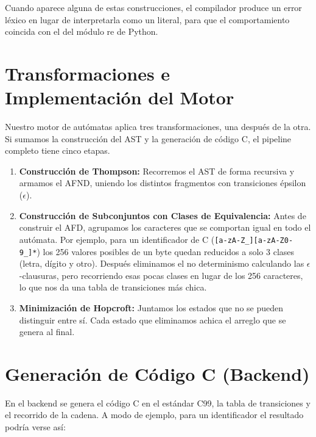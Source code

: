 \documentclass[runningheads]{llncs}
\begin{document}
Cuando aparece alguna de estas construcciones, el compilador produce un error léxico en lugar de interpretarla como un literal, para que el comportamiento coincida con el del módulo re de Python.

\section{Transformaciones e Implementación del Motor}
Nuestro motor de autómatas aplica tres transformaciones, una después de la otra. Si sumamos la construcción del AST y la generación de código C, el pipeline completo tiene cinco etapas.
\begin{enumerate}
  \item \textbf{Construcción de Thompson:} Recorremos el AST de forma recursiva y armamos el AFND, uniendo los distintos fragmentos con transiciones épsilon ($\epsilon$).
  \item \textbf{Construcción de Subconjuntos con Clases de Equivalencia:} Antes de construir el AFD, agrupamos los caracteres que se comportan igual en todo el autómata. Por ejemplo, para un identificador de C (\texttt{[a-zA-Z\_][a-zA-Z0-9\_]*}) los 256 valores posibles de un byte quedan reducidos a solo 3 clases (letra, dígito y otro). Después eliminamos el no determinismo calculando las $\epsilon$-clausuras, pero recorriendo esas pocas clases en lugar de los 256 caracteres, lo que nos da una tabla de transiciones más chica.
  \item \textbf{Minimización de Hopcroft:} Juntamos los estados que no se pueden distinguir entre sí. Cada estado que eliminamos achica el arreglo que se genera al final.
\end{enumerate}

\section{Generación de Código C (Backend)}\label{sec:backend}
En el backend se genera el código C en el estándar C99, la tabla de transiciones y el recorrido de la cadena. A modo de ejemplo, para un identificador el resultado podría verse así:
\end{document}
